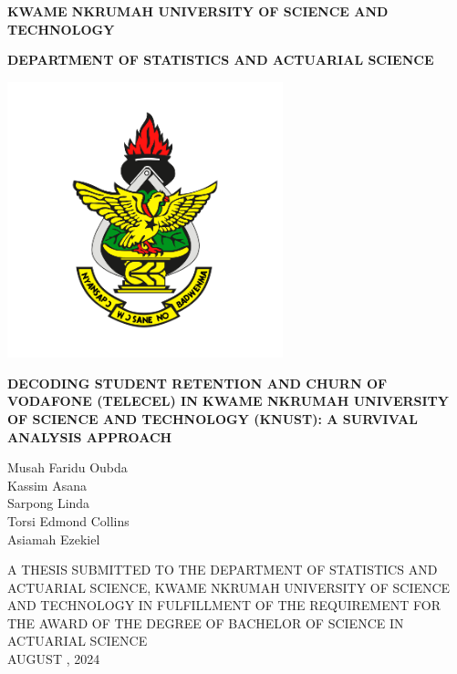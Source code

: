 \documentclass[doublespacing,12pt]{report}
\begin{document}
\begin{singlespace} %
\begin{titlepage}
\centering
    \large\textbf{KWAME NKRUMAH UNIVERSITY OF SCIENCE AND TECHNOLOGY}

      \vspace{0.2cm}
  \large\textbf{DEPARTMENT OF STATISTICS AND ACTUARIAL SCIENCE}
    
     \begin{center}
\includegraphics[width=0.6\textwidth]{logo.png}\end{center}

   \large{\textbf{\MakeUppercase{Decoding Student Retention and Churn of Vodafone (Telecel) in Kwame Nkrumah University of Science and Technology (KNUST): A Survival Analysis Approach}}}
\vspace{0.4cm}
   \\
    \vspace{0.4cm}
    
\large{Musah Faridu Oubda\\
Kassim Asana\\
Sarpong Linda\\
Torsi Edmond Collins\\
Asiamah Ezekiel}

    \vspace{0.4cm}  
    \small{A THESIS SUBMITTED TO THE DEPARTMENT OF STATISTICS AND ACTUARIAL SCIENCE, KWAME NKRUMAH UNIVERSITY OF SCIENCE AND TECHNOLOGY IN FULFILLMENT OF THE REQUIREMENT FOR THE AWARD OF THE DEGREE OF BACHELOR OF SCIENCE IN ACTUARIAL SCIENCE}\\
    \vspace{0.4cm}
    {AUGUST , 2024}
\end{titlepage}
\end{singlespace} %
\end{document}
